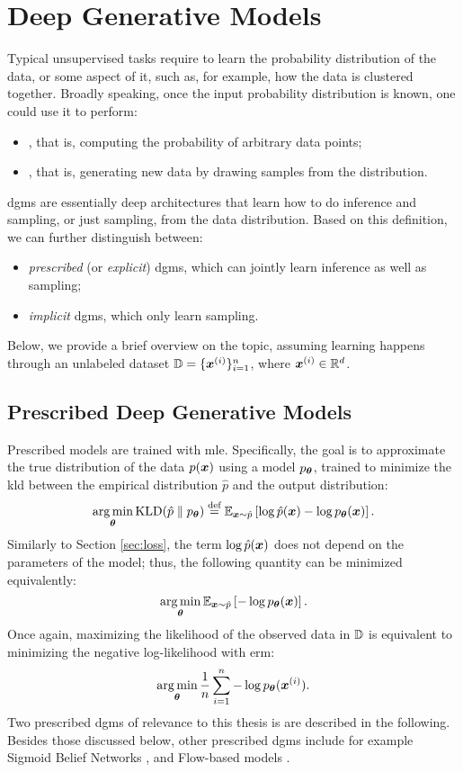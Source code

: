 \section{Deep Generative Models}\label{sec:dgm}
Typical unsupervised tasks require to learn the probability distribution of the data, or some aspect of it, such as, for example, how the data is clustered together. Broadly speaking, once the input probability distribution is known, one could use it to perform:
\begin{itemize}
    \item {}, that is, computing the probability of arbitrary data points;
    \item {}, that is, generating new data by drawing samples from the distribution.
\end{itemize}
\glspl{dgm} \citep{goodfellow2016dl} are essentially deep architectures that learn how to do inference and sampling, or just sampling, from the data distribution. Based on this definition, we can further distinguish between:
\begin{itemize}
    \item \emph{prescribed} (or \emph{explicit}) \glspl{dgm}, which can jointly learn inference as well as sampling;
    \item \emph{implicit} \glspl{dgm}, which only learn sampling.
\end{itemize}
Below, we provide a brief overview on the topic, assuming learning happens through an unlabeled dataset $\Data = \{\PatternVector{x}{i}\}_{i=1}^n$, where $\PatternVector{x}{i} \in \Real^d$.

\subsection{Prescribed Deep Generative Models}\label{sec:autoregressive}
Prescribed models are trained with \gls{mle}. Specifically, the goal is to approximate the true distribution of the data $p(\Vector{x})$ using a model $p_{\boldsymbol{\theta}}$, trained to minimize the \gls{kld} between the empirical distribution $\hat{p}$ and the output distribution:
$$\argmin_{\Param} \KLD{\hat{p}}{p_{\Param}} \defeq \Expectation{\Vector{x} \sim \hat{p}}{\log \hat{p}(\Vector{x}) -\log p_{\Param}(\Vector{x})}.$$
Similarly to Section \ref{sec:loss}, the term $\log \hat{p}(\Vector{x})$ does not depend on the parameters of the model; thus, the following quantity can be minimized equivalently:
$$\argmin_{\Param} \Expectation{\Vector{x} \sim \hat{p}}{-\log p_{\Param}(\Vector{x})}.$$
Once again, maximizing the likelihood of the observed data in $\mathbb{D}$ is equivalent to minimizing the negative log-likelihood with \gls{erm}:
$$\argmin_{\Param} \frac{1}{n} \sum_{i=1}^n -\log p_{\Param}(\PatternVector{x}{i}).$$
Two prescribed \glspl{dgm} of relevance to this thesis is are described in the following. Besides those discussed below, other prescribed \glspl{dgm} include for example Sigmoid Belief Networks \citep{neal1992sigmoidbeliefnet}, and Flow-based models \citep{rezende2015normalizingflows}.

